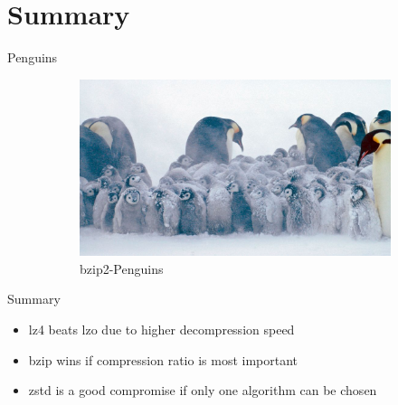\documentclass[10pt, compress]{beamer}
\begin{document}
\section{Summary}
\begin{frame}{Penguins}
\begin{figure}
\captionsetup[subfigure]{labelformat=empty}
  \begin{subfigure}[b]{.45\linewidth}
    \centering
    \caption{bzip2-Penguins}
    \includegraphics[scale=0.15, angle=5]{pics/bzip2penguin.jpg}
  \end{subfigure}\hfill
  \begin{subfigure}[b]{.45\linewidth}
  	\centering
  \end{subfigure}
\end{figure}
\end{frame}


\begin{frame}{Summary}
	\begin{itemize}
		\item lz4 beats lzo due to higher decompression speed
		\item bzip wins if compression ratio is most important
		\item zstd is a good compromise if only one algorithm can be chosen
	\end{itemize}
\end{frame}
\end{document}

